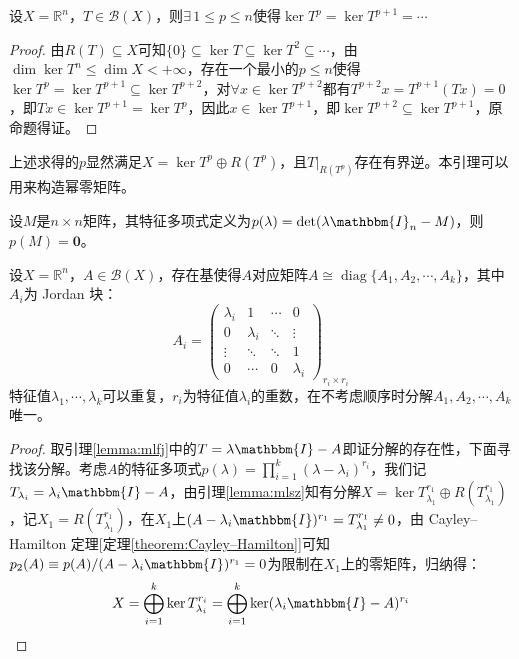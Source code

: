 \begin{lemma}\label{lemma:mlsz}
设$X=\mathbb{R}^n$，$T \in \mathscr{B}(X)$，则$\exists \, 1 \leq p \leq n$使得$\ker T^p=\ker T^{p+1}=\cdots$
\end{lemma}
\begin{proof}
由$R(T) \subseteq X$可知$\{0\} \subseteq \ker T \subseteq \ker T^2 \subseteq \cdots$，由$\dim\ker T^n \leq \dim X<+\infty$，存在一个最小的$p \leq n$使得$\ker T^p=\ker T^{p+1} \subseteq \ker T^{p+2}$，对$\forall x \in \ker T^{p+2}$都有$T^{p+2}x=T^{p+1}(Tx)=0$，即$Tx \in \ker T^{p+1}=\ker T^p$，因此$x \in \ker T^{p+1}$，即$\ker T^{p+2} \subseteq \ker T^{p+1}$，原命题得证。
\end{proof}
\begin{remark}
\quad 上述求得的$p$显然满足$X=\ker T^p \oplus R(T^p)$，且$T|_{R(T^p)}$存在有界逆。本引理可以用来构造幂零矩阵。
\end{remark}
\begin{theorem}\label{theorem:Cayley–Hamilton}
设$M$是$n \times n$矩阵，其特征多项式定义为$p(\lambda)=\det(\lambda\mathbbm{I}_n-M)$，则$p(M)=\mathbf{0}$。
\end{theorem}

\begin{theorem}
设$X=\mathbb{R}^n$，$A \in \mathscr{B}(X)$，存在基使得$A$对应矩阵$A \cong \operatorname{diag}\{A_1,A_2,\cdots,A_k\}$，其中$A_i$为 Jordan 块：
\[A_i=\begin{pmatrix}
\lambda_i & 1 & \cdots & 0 \\
0 & \lambda_i & \ddots & \vdots \\
\vdots & \ddots & \ddots & 1 \\
0 & \cdots & 0 & \lambda_i
\end{pmatrix}_{r_i \times r_i}\]
特征值$\lambda_1,\cdots,\lambda_k$可以重复，$r_i$为特征值$\lambda_i$的重数，在不考虑顺序时分解$A_1,A_2,\cdots,A_k$唯一。
\end{theorem}
\begin{proof}
取引理\ref{lemma:mlfj}中的$T=\lambda\mathbbm{I}-A$即证分解的存在性，下面寻找该分解。考虑$A$的特征多项式$p(\lambda)=\prod\limits_{i=1}^k(\lambda-\lambda_i)^{r_i}$，我们记$T_{\lambda_i}=\lambda_i\mathbbm{I}-A$，由引理\ref{lemma:mlsz}知有分解$X=\ker T_{\lambda_1}^{r_1} \oplus R(T_{\lambda_1}^{r_1})$，记$X_1=R(T_{\lambda_1}^{r_1})$，在$X_1$上$(A-\lambda_i\mathbbm{I})^{r_1}=T_{\lambda_1}^{r_1} \neq 0$，由 Cayley–Hamilton 定理[定理\ref{theorem:Cayley–Hamilton}]可知$p_2(A) \equiv p(A)/(A-\lambda_i\mathbbm{I})^{r_1}=0$为限制在$X_1$上的零矩阵，归纳得：
\[X=\bigoplus_{i=1}^k\ker T_{\lambda_i}^{r_i}=\bigoplus_{i=1}^k\ker(\lambda_i\mathbbm{I}-A)^{r_i}\]
\end{proof}
\newpage

